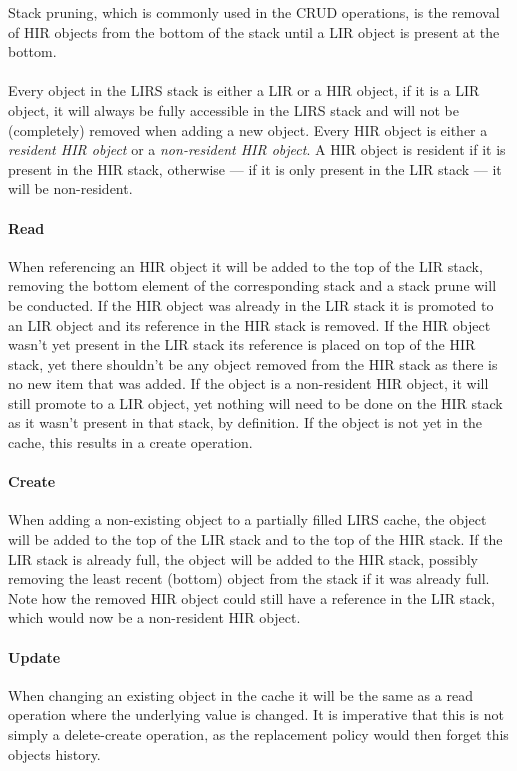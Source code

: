 \documentclass[pdftex,a4paper,12pt,twoside]{report}
\begin{document}
Stack pruning, which is commonly used in the CRUD operations, is the removal of HIR objects from the bottom of the stack until a LIR object is present at the bottom.
\\\\
Every object in the LIRS stack is either a LIR or a HIR object, if it is a LIR object, it will always be fully accessible in the LIRS stack and will not be (completely) removed when adding a new object. Every HIR object is either a \emph{resident HIR object} or a \emph{non-resident HIR object}. A HIR object is resident if it is present in the HIR stack, otherwise --- if it is only present in the LIR stack --- it will be non-resident.
\paragraph{Read} When referencing an HIR object it will be added to the top of the LIR stack, removing the bottom element of the corresponding stack and a stack prune will be conducted. If the HIR object was already in the LIR stack it is promoted to an LIR object and its reference in the HIR stack is removed. If the HIR object wasn't yet present in the LIR stack its reference is placed on top of the HIR stack, yet there shouldn't be any object removed from the HIR stack as there is no new item that was added. If the object is a non-resident HIR object, it will still promote to a LIR object, yet nothing will need to be done on the HIR stack as it wasn't present in that stack, by definition. If the object is not yet in the cache, this results in a create operation.
\paragraph{Create} When adding a non-existing object to a partially filled LIRS cache, the object will be added to the top of the LIR stack and to the top of the HIR stack. If the LIR stack is already full, the object will be added to the HIR stack, possibly removing the least recent (bottom) object from the stack if it was already full. Note how the removed HIR object could still have a reference in the LIR stack, which would now be a non-resident HIR object.
\paragraph{Update} When changing an existing object in the cache it will be the same as a read operation where the underlying value is changed. It is imperative that this is not simply a delete-create operation, as the replacement policy would then forget this objects history.
\end{document}
